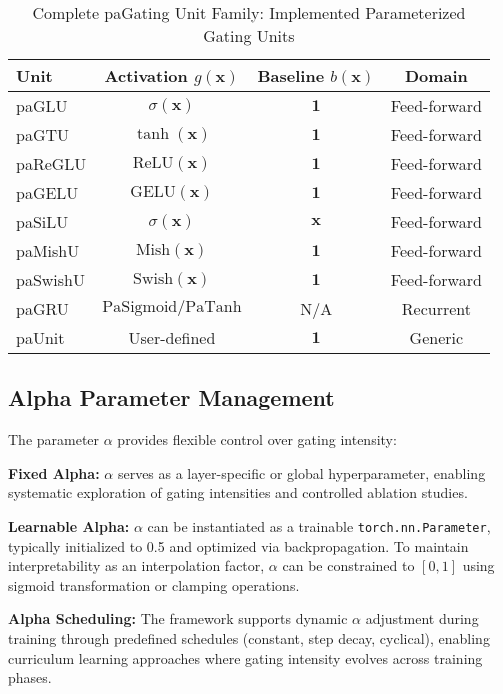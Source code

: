 \documentclass[lettersize,journal]{IEEEtran}
\begin{document}
\begin{table}[!t]
\caption{Complete paGating Unit Family: Implemented Parameterized Gating Units}
\label{tab:gating_units}
\centering
\begin{tabular}{|l|c|c|c|}
\hline
\textbf{Unit} & \textbf{Activation } $g(\mathbf{x})$ & \textbf{Baseline } $b(\mathbf{x})$ & \textbf{Domain} \\
\hline
paGLU & $\sigma(\mathbf{x})$ & $\mathbf{1}$ & Feed-forward \\
paGTU & $\tanh(\mathbf{x})$ & $\mathbf{1}$ & Feed-forward \\
paReGLU & $\text{ReLU}(\mathbf{x})$ & $\mathbf{1}$ & Feed-forward \\
paGELU & $\text{GELU}(\mathbf{x})$ & $\mathbf{1}$ & Feed-forward \\
paSiLU & $\sigma(\mathbf{x})$ & $\mathbf{x}$ & Feed-forward \\
paMishU & $\text{Mish}(\mathbf{x})$ & $\mathbf{1}$ & Feed-forward \\
paSwishU & $\text{Swish}(\mathbf{x})$ & $\mathbf{1}$ & Feed-forward \\
paGRU & $\text{PaSigmoid}/\text{PaTanh}$ & N/A & Recurrent \\
paUnit & User-defined & $\mathbf{1}$ & Generic \\
\hline
\end{tabular}
\end{table}

\subsection{Alpha Parameter Management}
The parameter $\alpha$ provides flexible control over gating intensity:

\textbf{Fixed Alpha:} $\alpha$ serves as a layer-specific or global hyperparameter, enabling systematic exploration of gating intensities and controlled ablation studies.

\textbf{Learnable Alpha:} $\alpha$ can be instantiated as a trainable \texttt{torch.nn.Parameter}, typically initialized to 0.5 and optimized via backpropagation. To maintain interpretability as an interpolation factor, $\alpha$ can be constrained to $[0,1]$ using sigmoid transformation or clamping operations.

\textbf{Alpha Scheduling:} The framework supports dynamic $\alpha$ adjustment during training through predefined schedules (constant, step decay, cyclical), enabling curriculum learning approaches where gating intensity evolves across training phases.
\end{document}
